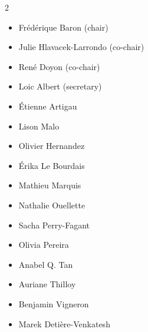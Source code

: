 \begin{multicols}{2}
\begin{itemize}
  \item Fr\'ed\'erique Baron (chair)
  \item Julie Hlavacek-Larrondo (co-chair)
  \item Ren\'e Doyon (co-chair)
  \item Loic Albert (secretary)
  \item \'Etienne Artigau
  \item Lison Malo
  \item Olivier Hernandez
  \item \'Erika Le Bourdais
  \item Mathieu Marquis
  \item Nathalie Ouellette
  \item Sacha Perry-Fagant
  \item Olivia Pereira
  \item Anabel Q. Tan
  \item Auriane Thilloy
  \item Benjamin Vigneron
  \item Marek Detière-Venkatesh
\end{itemize}
\end{multicols}